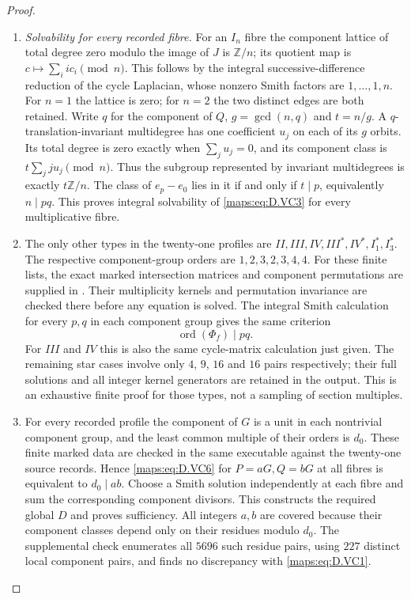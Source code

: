 \begin{proof}
\begin{enumerate}[label=\arabic*.,leftmargin=*]
\item \emph{Solvability for every recorded fibre.}
For an $I_n$ fibre the component lattice of total degree
zero modulo the image of $J$ is $\mathbb Z/n$; its quotient
map is $c\mapsto\sum_i i c_i\pmod n$.
This follows by the integral successive-difference reduction
of the cycle Laplacian, whose nonzero Smith factors are
$1,\ldots,1,n$. For $n=1$ the lattice is zero; for $n=2$
the two distinct edges are both retained.
Write $q$ for the component of $Q$, $g=\gcd(n,q)$ and
$t=n/g$. A $q$-translation-invariant multidegree has one
coefficient $u_j$ on each of its $g$ orbits. Its total degree
is zero exactly when $\sum_j u_j=0$, and its component
class is $t\sum_j j u_j\pmod n$.
Thus the subgroup represented by invariant multidegrees
is exactly $t\mathbb Z/n$. The class of $e_p-e_0$ lies in it
if and only if $t\mid p$, equivalently $n\mid pq$.
This proves integral solvability of \eqref{maps:eq:D.VC3} for every
multiplicative fibre.

\item The only other types in the twenty-one profiles are
$II,III,IV,III^*,IV^*,I_1^*,I_3^*$.
The respective component-group orders are $1,2,3,2,3,4,4$.
For these finite lists, the exact marked intersection
matrices and component permutations are supplied in
.
Their multiplicity kernels and permutation invariance are
checked there before any equation is solved. The integral
Smith calculation for every $p,q$ in each component group
gives the same criterion
\[
              \operatorname{ord}(\Phi_f)\mid pq.           \tag{D.VC6}\label{maps:eq:D.VC6}
\]
For $III$ and $IV$ this is also the same cycle-matrix
calculation just given. The remaining star cases involve
only $4$, $9$, $16$ and $16$ pairs respectively; their
full solutions and all integer kernel generators are
retained in the output. This is an exhaustive finite
proof for those types, not a sampling of section multiples.

\item For every recorded profile the component of $G$ is a unit
in each nontrivial component group, and the least common
multiple of their orders is $d_0$. These finite marked
data are checked in the same executable against the
twenty-one source records. Hence \eqref{maps:eq:D.VC6} for $P=aG,Q=bG$
at all fibres is equivalent to $d_0\mid ab$.
Choose a Smith solution independently at each fibre and
sum the corresponding component divisors. This constructs
the required global $D$ and proves sufficiency.
All integers $a,b$ are covered because their component
classes depend only on their residues modulo $d_0$.
The supplemental check enumerates all $5696$ such residue
pairs, using $227$ distinct local component pairs, and
finds no discrepancy with \eqref{maps:eq:D.VC1}.


\end{enumerate}
\end{proof}
